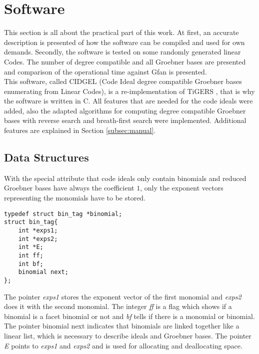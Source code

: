 \section{Software}
\label{sec:software}
This section is all about the practical part of this work. At first, an accurate description is presented of how the software can be compiled and used for own demands.
Secondly, the software is tested on some randomly generated linear Codes. The number of degree compatible and all Groebner bases are presented and comparison of the operational time against Gfan \cite{gfan} is presented. \\
This software, called CIDGEL (Code Ideal degree compatible Groebner bases enumerating from Linear Codes), is a re-implementation of TiGERS \cite{tigers}, that is why the software is written in C. All features that are needed for the code ideals were added, also the adapted algorithms for computing degree compatible Groebner bases with reverse search and breath-first search were implemented.   
Additional features are explained in Section \ref{subsec:manual}.\\


\subsection{Data Structures}
\label{subsec:datastructure}
With the special attribute that code ideals only contain binomials and reduced Groebner bases have always the coefficient $1$, only the exponent vectors representing the monomials have to be stored.


\begin{lstlisting} 
typedef struct bin_tag *binomial;
struct bin_tag{
    int *exps1;
    int *exps2;
    int *E;
    int ff;
    int bf;
    binomial next;
};

\end{lstlisting}
\newpage
The pointer \emph{exps1} stores the exponent vector of the first monomial and \emph{exps2} does it with the second monomial.
The integer \emph{ff} is a flag which shows if a binomial is a facet binomial or not and \emph{bf} tells if there is a monomial or binomial.
The pointer binomial next indicates that binomials are linked together like a linear list, which is necessary to describe ideals and Groebner bases. The pointer \emph{E} points to \emph{exps1} and \emph{exps2} and is used for allocating and deallocating space. \\

